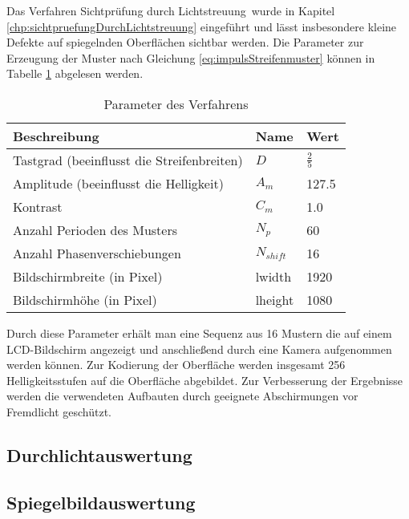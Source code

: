 Das Verfahren \glqq Sichtprüfung durch Lichtstreuung\grqq ~wurde in Kapitel \ref{chp:sichtpruefungDurchLichtstreuung} eingeführt und lässt insbesondere kleine Defekte auf spiegelnden Oberflächen sichtbar werden.
Die Parameter zur Erzeugung der Muster nach Gleichung \ref{eq:impulsStreifenmuster} können in Tabelle \ref{tab:paramSichtpruefung} abgelesen werden.

\begin{table}[H]
	\centering
	\begin{tabular}{lll}
		\hline 
		\textbf{Beschreibung} & \textbf{Name} & \textbf{Wert} \\ 
		\hline 
		Tastgrad (beeinflusst die Streifenbreiten) & $D$ & $\tfrac{2}{5}$ \\ 
		Amplitude (beeinflusst die Helligkeit) & $A_m$ & 127.5 \\ 
		Kontrast & $C_m$ & 1.0 \\ 
		Anzahl Perioden des Musters & $N_p$ & 60 \\
		Anzahl Phasenverschiebungen & $N_{shift}$ & 16 \\ 
		Bildschirmbreite (in Pixel) & \acrshort{lwidth} & 1920 \\
		Bildschirmhöhe (in Pixel) & \acrshort{lheight} & 1080 \\ 
		\hline 
	\end{tabular}
	\caption{Parameter des Verfahrens}
	\label{tab:paramSichtpruefung}
\end{table}

\noindent
Durch diese Parameter erhält man eine Sequenz aus 16 Mustern die auf einem LCD-Bildschirm angezeigt und anschließend durch eine Kamera aufgenommen werden können.
Zur Kodierung der Oberfläche werden insgesamt 256 Helligkeitsstufen auf die Oberfläche abgebildet.
Zur Verbesserung der Ergebnisse werden die verwendeten Aufbauten durch geeignete Abschirmungen vor Fremdlicht geschützt.

{
	\FloatBarrier
    \subsection{Durchlichtauswertung}
    \label{sub:durchlichtAuswertungLichtstreuung}
    
}

{
	\FloatBarrier
    \subsection{Spiegelbildauswertung}
    \label{sub:spiegelbildAuswertungLichtstreuung}
    
}